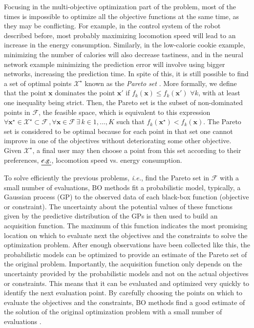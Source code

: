 \documentclass[review,preprint,12pt]{elsarticle}
\begin{document}
Focusing in the multi-objective optimization part of the problem, most of the times is impossible 
to optimize all the objective functions at the same time, as they may 
be conflicting. For example, in the control system of the robot described before, most probably 
maximizing locomotion speed will lead to an increase in the energy consumption. Similarly, in the 
low-calorie cookie example, minimizing the number of calories will also decrease tastiness,
and in the neural network example minimizing the prediction error will involve using bigger 
networks, increasing the prediction time. In spite of this, it is still possible to 
find a set of optimal points $\mathcal{X}^{\star}$  known as the \textit{Pareto set} 
\citep{siarry2003multiobjective}. More formally, we define that the point $\mathbf{x}$ 
dominates the point $\mathbf{x}'$ if $f_k (\mathbf{x})\leq f_k (\mathbf{x}')$ $\forall k$, 
with at least one inequality being strict. Then, the Pareto set is the subset of 
non-dominated points in $\mathcal{F}$, the feasible space, which is equivalent to this 
expression $\forall \mathbf{x}^{\star} \in \mathcal{X}^{\star} \subset \mathcal{F} \,, 
\forall \mathbf{x} \in \mathcal{F}\, \exists\, k \in {1,...,K}$ such that $f_k(\mathbf{x}^{\star}) < f_k(\mathbf{x})$. 
The Pareto set is considered to be optimal because for each point in that set 
one cannot improve in one of the objectives without deteriorating some
other objective. Given $\mathcal{X}^\star$, a final user may then choose a point
from this set according to their preferences, $\emph{e.g.}$, locomotion speed vs. energy consumption.

To solve efficiently the previous problems, \emph{i.e.}, find the Pareto set in $\mathcal{F}$ with 
a small number of evaluations, BO methods fit a probabilistic model, typically, a Gaussian process (GP) to 
the observed data of each black-box function (objective or constraint). The uncertainty about the potential values of
these functions given by the predictive distribution of the GPs is then used to build an acquisition
function. The maximum of this function indicates the most promising location on
which to evaluate next the objectives and the constraints to solve the
optimization problem. 
After enough observations have been collected like this, 
the probabilistic models can be optimized
to provide an estimate of the Pareto set of the original
problem. Importantly, the acquisition function only depends
on the uncertainty provided by the probabilistic models and
not on the actual objectives or constraints. This means that
it can be evaluated and optimized very quickly to identify
the next evaluation point. By carefully choosing the points on
which to evaluate the objectives and the constraints, BO
methods find a good estimate of the solution of the 
original optimization problem with a small number of
evaluations \citep{brochu2010tutorial,shahriari2016taking}.
\end{document}
